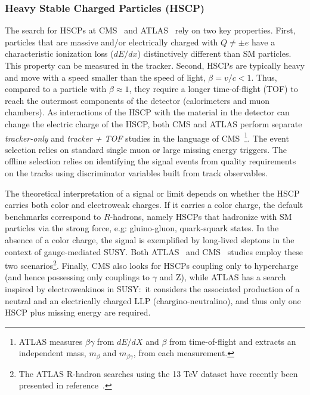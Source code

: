 \subsubsection{Heavy Stable Charged Particles (HSCP)} 
\label{subsec:ExpHSCP}

The search for HSCPs at CMS~\cite{Chatrchyan:2013oca,CMS:2016ybj} and ATLAS~\cite{ATLAS:2014fka,Aaboud:2016uth} rely on two key properties. First, particles that are massive and/or electrically charged with $Q \ne \pm e$ have a  characteristic ionization loss ($dE/dx$) distinctively different than SM particles. This property can be measured in the tracker.
Second, HSCPs are typically heavy and move with a speed smaller than the speed of light, $\beta = v/c < 1$. Thus, compared to a particle with $\beta \approx 1$, they require a longer time-of-flight (TOF) to reach the outermost components of the detector (calorimeters and muon chambers).  As interactions of the HSCP with the material in the detector can change the electric charge of the HSCP, both CMS and ATLAS perform separate \emph{tracker-only} and \emph{tracker + TOF} studies in the language of CMS~\footnote{ATLAS measures $\beta \gamma$ from $dE/dX$ and $\beta$ from time-of-flight and extracts an independent mass, $m_{\beta}$ and $m_{\beta \gamma}$, from each measurement.}. The event selection relies on standard single muon or large missing energy triggers. The offline selection relies on identifying the signal events from quality requirements on the tracks using discriminator variables built from track observables. 

The theoretical interpretation of a signal or limit depends on whether the HSCP carries both color and electroweak charges. If it carries a color charge, the default benchmarks correspond to $R$-hadrons, namely HSCPs that hadronize with SM particles via the strong force, e.g: gluino-gluon, quark-squark states. In the absence of a color charge, the signal is exemplified by long-lived sleptons in the context of gauge-mediated SUSY. Both ATLAS~\cite{ATLAS:2014fka} and CMS~\cite{CMS:2016ybj} studies employ these two scenarios\footnote{The ATLAS R-hadron searches using the 13 TeV dataset have recently been presented in reference~\cite{Aaboud:2016uth}. }.
Finally, CMS also looks for HSCPs coupling only to hypercharge (and hence possessing only couplings to $\gamma$ and Z), while ATLAS has a search inspired by electroweakinos in SUSY:~it considers the associated production of a neutral and an electrically charged LLP (chargino-neutralino), and thus only one HSCP plus missing energy are required.

